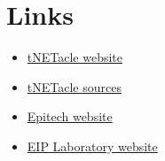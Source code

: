 \section{Links}

\begin{itemize}
\item \href{http://eip.epitech.eu/2013/tnetacle/tnetacle.html}{tNETacle website}
\item \href{https://github.com/LaKabane/tNETacle}{tNETacle sources}
\item \href{http://www.epitech.eu}{Epitech website}
\item \href{http://eip.epitech.eu}{EIP Laboratory website}
\end{itemize}

